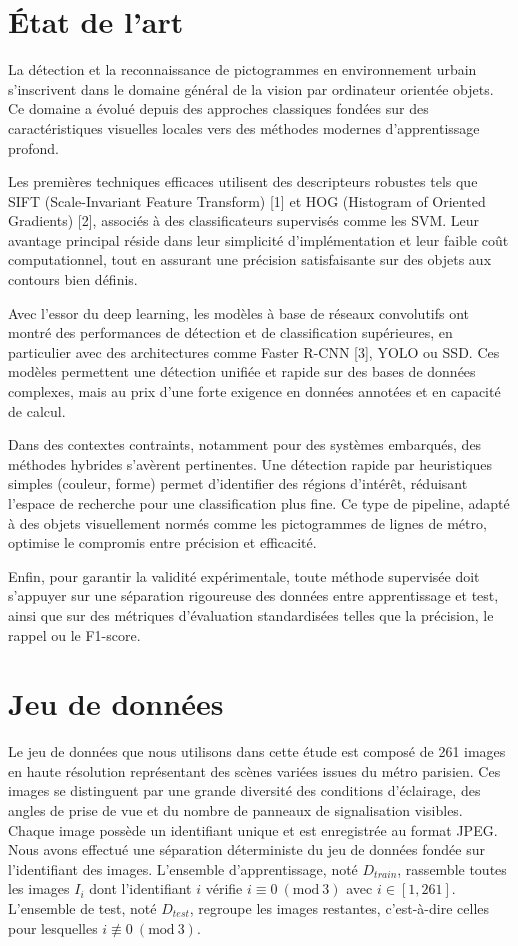 \documentclass[journal]{IEEEtran}
\begin{document}
\section{État de l'art}

La détection et la reconnaissance de pictogrammes en environnement urbain s'inscrivent dans le domaine général de la vision par ordinateur orientée objets. Ce domaine a évolué depuis des approches classiques fondées sur des caractéristiques visuelles locales vers des méthodes modernes d'apprentissage profond.

Les premières techniques efficaces utilisent des descripteurs robustes tels que SIFT (Scale-Invariant Feature Transform) [1] et HOG (Histogram of Oriented Gradients) [2], associés à des classificateurs supervisés comme les SVM. Leur avantage principal réside dans leur simplicité d'implémentation et leur faible coût computationnel, tout en assurant une précision satisfaisante sur des objets aux contours bien définis.

Avec l'essor du deep learning, les modèles à base de réseaux convolutifs ont montré des performances de détection et de classification supérieures, en particulier avec des architectures comme Faster R-CNN [3], YOLO ou SSD. Ces modèles permettent une détection unifiée et rapide sur des bases de données complexes, mais au prix d'une forte exigence en données annotées et en capacité de calcul.

Dans des contextes contraints, notamment pour des systèmes embarqués, des méthodes hybrides s'avèrent pertinentes. Une détection rapide par heuristiques simples (couleur, forme) permet d'identifier des régions d'intérêt, réduisant l'espace de recherche pour une classification plus fine. Ce type de pipeline, adapté à des objets visuellement normés comme les pictogrammes de lignes de métro, optimise le compromis entre précision et efficacité.

Enfin, pour garantir la validité expérimentale, toute méthode supervisée doit s'appuyer sur une séparation rigoureuse des données entre apprentissage et test, ainsi que sur des métriques d'évaluation standardisées telles que la précision, le rappel ou le F1-score.

\section{Jeu de données}

Le jeu de données que nous utilisons dans cette étude est composé de 261 images en haute résolution représentant des scènes variées issues du métro parisien. Ces images se distinguent par une grande diversité des conditions d'éclairage, des angles de prise de vue et du nombre de panneaux de signalisation visibles. Chaque image possède un identifiant unique et est enregistrée au format JPEG. Nous avons effectué une séparation déterministe du jeu de données fondée sur l'identifiant des images. L'ensemble d'apprentissage, noté $D_{train}$, rassemble toutes les images $I_i$ dont l'identifiant $i$ vérifie $i \equiv 0 \ (\text{mod} \ 3)$ avec $i \in [1,261]$. L'ensemble de test, noté $D_{test}$, regroupe les images restantes, c'est-à-dire celles pour lesquelles $i \not\equiv 0 \ (\text{mod} \ 3)$.
\end{document}
